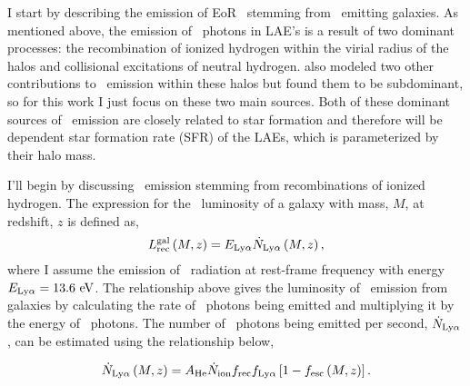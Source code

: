 \label{ref:laes}

I start by describing the emission of EoR \lya\ stemming from \lya\ emitting
galaxies. As mentioned above, the emission of \lya\ photons in LAE's is a result
of two dominant processes: the recombination of ionized hydrogen within the virial
radius of the halos and collisional excitations of neutral hydrogen. \cite{2013ApJ...763..132S}
also modeled two other contributions to \lya\ emission within these halos but
found them to be subdominant, so for this work I just focus on these two main sources.
Both of these dominant sources of \lya\ emission are closely related to star formation and therefore
will be dependent star formation rate (SFR) of the LAEs, which is parameterized
by their halo mass.

I'll begin by discussing \lya\ emission stemming from recombinations of ionized hydrogen.
The expression for the \lya\ luminosity of a galaxy with mass, $M$, at redshift, $z$ is defined as,
\begin{equation}
  L_{\rm rec}^{\rm gal} \left( M, z\right) = E_{\rm Ly\alpha} \dot{N}_{\rm Ly\alpha} \left( M, z\right),
\end{equation}
where I assume the emission of \lya\ radiation at rest-frame frequency
with energy $E_{\rm Ly\alpha} = 13.6 \ {\rm eV}$. The relationship above gives the
luminosity of \lya\ emission from galaxies by calculating the rate of \lya\
photons being emitted and multiplying it by the energy of \lya\ photons. The number of
\lya\ photons being emitted per second, $\dot{N}_{\rm Ly\alpha}$, can be estimated
using the relationship below,

\begin{equation}
  \dot{N}_{\rm Ly\alpha} \left( M, z\right) = A_{\rm He} \dot{N}_{\rm ion} f_{\rm rec} f_{\rm Ly\alpha} \left[ 1 - f_{\rm esc} \left( M, z\right) \right].
\end{equation}


